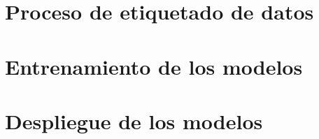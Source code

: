\section{Proceso de etiquetado de datos}
\label{sec:etiquetado}



\section{Entrenamiento de los modelos}
\label{sec:entrenamiento}



\section{Despliegue de los modelos}
\label{sec:despliegue_modelos}

